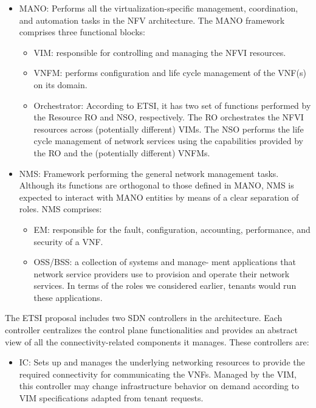 \documentclass[a4paper,12pt]{report} %
\begin{document}
\begin{itemize}
\item \gls{MANO}: Performs all the virtualization-specific management, coordination, and automation tasks in the NFV architecture. The MANO framework comprises three functional blocks:
\begin{itemize}
\item \gls{VIM}: responsible for controlling and managing the NFVI resources.
\end{itemize}
\begin{itemize}
\item \gls{VNFM}: performs configuration and life cycle management of the VNF(s) on its domain.
\end{itemize}
\begin{itemize}
\item Orchestrator: According to ETSI, it has two set of functions performed by the Resource \gls{RO} and \gls{NSO}, respectively. The RO orchestrates the NFVI resources across (potentially different) VIMs. The NSO performs the life cycle management of network
services using the capabilities provided by the
RO and the (potentially different) VNFMs.
\end{itemize}
\end{itemize}
\begin{itemize}
\item \gls{NMS}: Framework performing the general network management tasks. Although its functions are orthogonal to those defined in MANO, NMS is expected to interact with MANO entities by means of a clear separation of roles. NMS comprises:
\begin{itemize}
\item \gls{EM}: responsible for the fault, configuration,
accounting, performance, and security of a VNF.
\end{itemize}
\begin{itemize}
\item \gls{OSS/BSS}: a collection of systems and manage-
ment applications that network service providers use to provision and operate their network
services. In terms of the roles we considered
earlier, tenants would run these applications.
\end{itemize}
\end{itemize}
The ETSI proposal includes two SDN controllers
in the architecture. Each controller centralizes
the control plane functionalities and provides an
abstract view of all the connectivity-related components it manages. These controllers are:
\begin{itemize}
\item \gls{IC}: Sets up
and manages the underlying networking resources to provide the required connectivity for communicating the VNFs.
Managed by the VIM, this controller may change
infrastructure behavior on demand according to
VIM specifications adapted from tenant requests.
\end{itemize}
\end{document}
